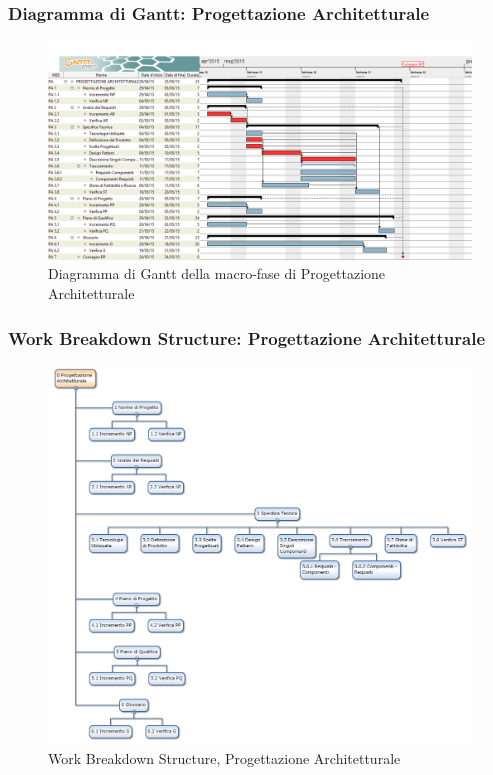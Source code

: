 \subsubsection{Diagramma di Gantt: Progettazione Architetturale}
\begin{figure}[h] 
	\centering
	\includegraphics[width=\textwidth]{./img/progettazione_architetturale.png}
	\caption{Diagramma di Gantt della macro-fase di Progettazione Architetturale}
\end{figure}

\newpage
\subsubsection{Work Breakdown Structure: Progettazione Architetturale}
\begin{figure}[h]
	\centering
	\includegraphics[width=\textwidth]{./img/wbs_progettazione_architetturale.png}
	\caption{Work Breakdown Structure, Progettazione Architetturale}
\end{figure}

